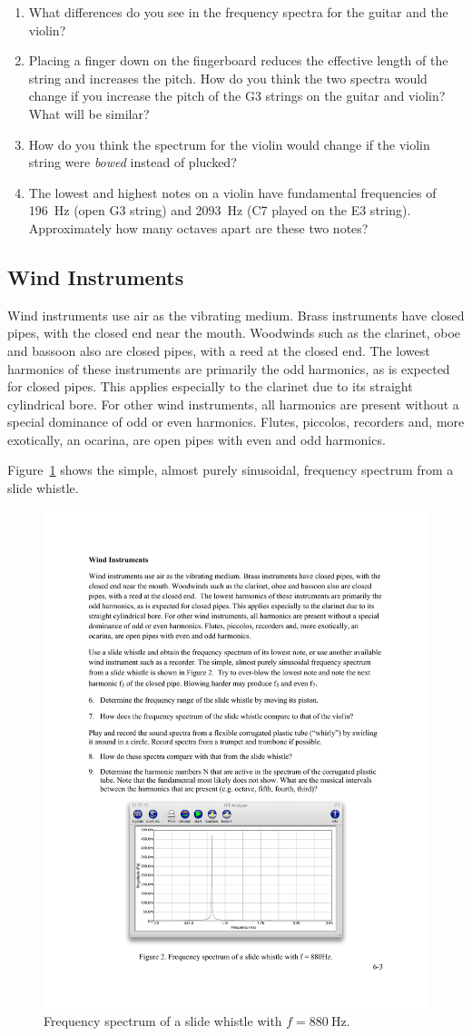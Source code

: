 \documentclass[11pt]{NSF}
\def\ben{\begin{enumerate}}
\def\een{\end{enumerate}}
\begin{document}
\ben
\item 
What differences do you see in the frequency spectra for the guitar
and the violin?

\item Placing a finger down on the fingerboard reduces the effective 
length of the string and increases the pitch.
How do you think the two spectra would change if you increase the 
pitch of the G3 strings on the guitar and violin?
What will be similar?

\item How do you think the spectrum for the violin would change if 
the violin string were {\em bowed} instead of plucked?

\item The lowest and highest notes on a violin have fundamental
frequencies of 196~Hz (open G3 string) and 2093~Hz (C7 played on 
the E3 string).  
Approximately how many octaves apart are these two notes?
\een

\subsection{Wind Instruments} 
Wind instruments use air as the vibrating medium. Brass instruments
have closed pipes, with the closed end near the mouth. Woodwinds such
as the clarinet, oboe and bassoon also are closed pipes, with a reed
at the closed end. The lowest harmonics of these instruments are
primarily the odd harmonics, as is expected for closed pipes. This
applies especially to the clarinet due to its straight cylindrical
bore. For other wind instruments, all harmonics are present without a
special dominance of odd or even harmonics. Flutes, piccolos,
recorders and, more exotically, an ocarina, are open pipes with even
and odd harmonics.  

Figure~\ref{f:2} shows the simple, almost purely sinusoidal, frequency
spectrum from a slide whistle.
%
\begin{figure}[hbtp]
\begin{center}
\includegraphics[width=.6\textwidth]{fig6_2}
\caption{Frequency spectrum of a slide whistle with 
$f =880~\textrm{Hz}$.}
\label{f:2}
\end{center}
\end{figure}
\end{document}
